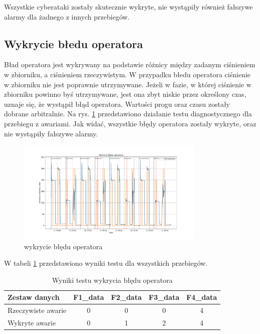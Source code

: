 \documentclass[a4paper,12pt]{article}
\begin{document}
Wszystkie cyberataki zostały skutecznie wykryte, nie wystąpiły również fałszywe alarmy dla żadnego z innych przebiegów.

\subsection{Wykrycie błedu operatora}

Bład operatora jest wykrywany na podstawie różnicy między zadanym ciśnieniem w zbiorniku, a ciśnieniem rzeczywistym. W przypadku błedu operatora ciśnienie w zbiorniku nie jest poprawnie utrzymywane. Jeżeli w fazie, w której ciśnienie w zbiorniku powinno byś utrzymywane, jest ona zbyt niskie przez określony czas, uznaje się, że wystąpił błąd operatora. Wartości progu oraz czasu zostały dobrane arbitralnie. Na rys. \ref{fig:error1} przedstawiono działanie testu diagnostycznego dla przebiegu z awariami. Jak widać, wszystkie błędy operatora zostały wykryte, oraz nie wystąpiły fałszywe alarmy.

\begin{figure}[H]
        \centering
        \includegraphics[width=0.8\textwidth]{error_detection}
        \caption{wykrycie błędu operatora}
        \label{fig:error1}
\end{figure}

W tabeli \ref{tab:error2} przedstawiono wyniki testu dla wszystkich przebiegów.

\begin{table}[H]
\centering
\caption{Wyniki testu wykrycia błędu operatora}
\begin{tabular}{lcccc}
\toprule
Zestaw danych & F1\_data & F2\_data & F3\_data & F4\_data\\
\midrule
Rzeczywiste awarie & 0 & 0 & 0 & 4\\
Wykryte awarie & 0 & 1 & 2 & 4\\
\bottomrule
\end{tabular}
\label{tab:error2}
\end{table}
\end{document}
